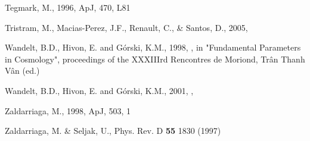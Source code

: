 \documentclass[12pt,twoside]{article}
\begin{document}
\begin{thebibliography}{99}
Tegmark, M., 1996, ApJ, 470, L81

Tristram, M., Macias-Perez, J.F., Renault, C., \& Santos, D., 2005, 

Wandelt, B.D., Hivon, E. and G\'orski, K.M., 1998, 
, in
 "Fundamental Parameters in Cosmology", proceedings of the XXXIIIrd Rencontres
de Moriond, Tr{\^a}n Thanh V{\^a}n (ed.)

Wandelt, B.D., Hivon, E. and G\'orski, K.M., 2001, 
,

 
Zaldarriaga, M., 1998, ApJ, 503, 1

Zaldarriaga, M. \& Seljak, U., Phys. Rev. D \textbf{55} 1830 (1997)


\end{thebibliography}
\end{document}
